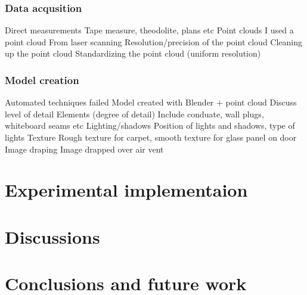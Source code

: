 \documentclass[11pt,a4paper]{article}
\begin{document}
		\subsubsection{Data acqusition}
			Direct measurements
				Tape measure, theodolite, plans etc
			Point clouds
				I used a point cloud
				From laser scanning
				Resolution/precision of the point cloud
				Cleaning up the point cloud
				Standardizing the point cloud (uniform resolution)
		\subsubsection{Model creation}
			Automated techniques failed
			Model created with Blender + point cloud
			Discuss level of detail
				Elements (degree of detail)
					Include conduate, wall plugs, whiteboard seams etc
				Lighting/shadows
					Position of lights and shadows, type of lights
				Texture
					Rough texture for carpet, smooth texture for glass panel on door
				Image draping
					Image drapped over air vent
					
				

\section{Experimental implementaion}

\section{Discussions}

\section{Conclusions and future work}

\newpage
\printbibliography
\end{document}
